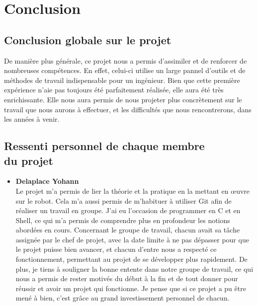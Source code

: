\chapter{Conclusion}

\section{Conclusion globale sur le projet}
De manière plus générale, ce projet nous a permis d'assimiler et de renforcer de nombreuses compétences. En effet, celui-ci utilise un large pannel d'outils et de méthodes de travail indispensable pour un ingénieur. Bien que cette première expérience n'aie pas toujours été parfaitement réalisée, elle aura été très enrichissante. Elle nous aura permis de nous projeter plus concrètement sur le travail que nous aurons à effectuer, et les difficultés que nous rencontrerons, dans les années à venir.

\section{Ressenti personnel de chaque membre \\ du projet}

\begin{itemize}
    \item \textbf{Delaplace Yohann}\\ Le projet m'a permis de lier la théorie et la pratique en la mettant en œuvre sur le robot. Cela m'a aussi permis de m'habituer à utiliser Git afin de réaliser un travail en groupe. J'ai eu l'occasion de programmer en C et en Shell, ce qui m'a permis de comprendre plus en profondeur les notions abordées en cours. Concernant le groupe de travail, chacun avait sa tâche assignée par le chef de projet, avec la date limite à ne pas dépasser pour que le projet puisse bien avancer, et chacun d'entre nous a respecté ce fonctionnement, permettant au projet de se développer plus rapidement. De plus, je tiens à souligner la bonne entente dans notre groupe de travail, ce qui nous a permis de rester motivés du début à la fin et de tout donner pour réussir et avoir un projet qui fonctionne. Je pense que si ce projet a pu être mené à bien, c'est grâce au grand investissement personnel de chacun.
\end{itemize}
\vspace{5mm}

